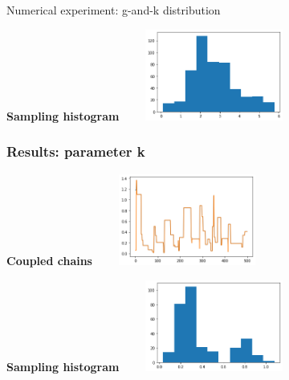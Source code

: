 \documentclass{beamer}
\begin{document}
\begin{section}{Numerical experiment: g-and-k distribution}
\begin{frame}
\begin{center}
		\begin{minipage}{0.63\textwidth}
			\begin{center}
				{\scriptsize \textbf{Sampling histogram }}
				\includegraphics[width=6cm,height=3cm]{immagini_mario/g_hist}
			\end{center}
		\end{minipage}
	\end{center}
\end{frame}
\begin{frame}
	\frametitle{Results: parameter k}
	\begin{center}
		\begin{minipage}{0.63\textwidth}
			\begin{center}
				{\scriptsize \textbf{Coupled chains}}
				\includegraphics[width=6cm,height=3cm]{immagini_mario/k_chains}
			\end{center}
		\end{minipage}
		
		\vspace{0.2cm}
		
		\begin{minipage}{0.63\textwidth}
			\begin{center}
				{\scriptsize \textbf{Sampling histogram }}
				\includegraphics[width=6cm,height=3cm]{immagini_mario/k_hist}
			\end{center}
		\end{minipage}
	\end{center}
\end{frame}
\end{section}
\end{document}
